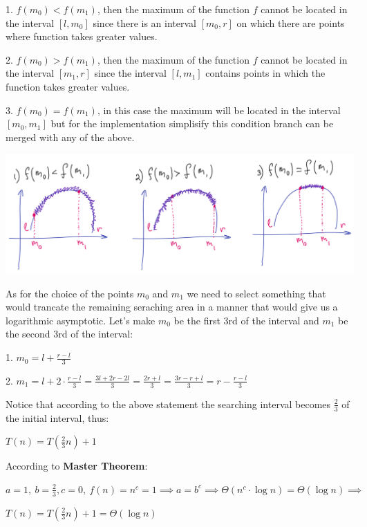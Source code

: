 \begin{definition}
    1. $f(m_0) < f(m_1)$, then the maximum of the function $f$ cannot be located in the interval $[l, m_0]$ since there is an interval $[m_0, r]$ on which there are points where function takes greater values.

    2. $f(m_0) > f(m_1)$, then the maximum of the function $f$ cannot be located in the interval $[m_1, r]$ since the interval $[l, m_1]$ contains points in which the function takes greater values.

    3. $f(m_0) = f(m_1)$, in this case the maximum will be located in the interval $[m_0, m_1]$ but for the implementation simplisify this condition branch can be merged with any of the above.

    \begin{center}
        \includegraphics[scale=0.47]{./assets/09-ternary-search/2.PNG}
    \end{center}

    As for the choice of the points $m_0$ and $m_1$ we need to select something that would trancate the remaining seraching area in a manner that would give us a logarithmic asymptotic. Let's make $m_0$ be the first 3rd of the interval and $m_1$ be the second 3rd of the interval:

    1. $m_0 = l + \frac{r - l}{3}$

    2. $m_1 = l + 2 \cdot \frac{r - l}{3} = \frac{3l + 2r -2l}{3} = \frac{2r + l}{3} = \frac{3r - r + l}{3} = r - \frac{r - l}{3}$

    Notice that according to the above statement the searching interval becomes $\frac{2}{3}$ of the initial interval, thus:

    $T(n) = T(\frac{2}{3}n) + 1$

    According to \textbf{Master Theorem}:

    $a = 1, \ b = \frac{2}{3}, c = 0, \ f(n) = n^c = 1 \implies a = b^c \implies \Theta(n^c \cdot \log{n}) = \Theta(\log{n}) \implies$

    $T(n) = T(\frac{2}{3}n) + 1 = \Theta(\log{n})$

\end{definition}



